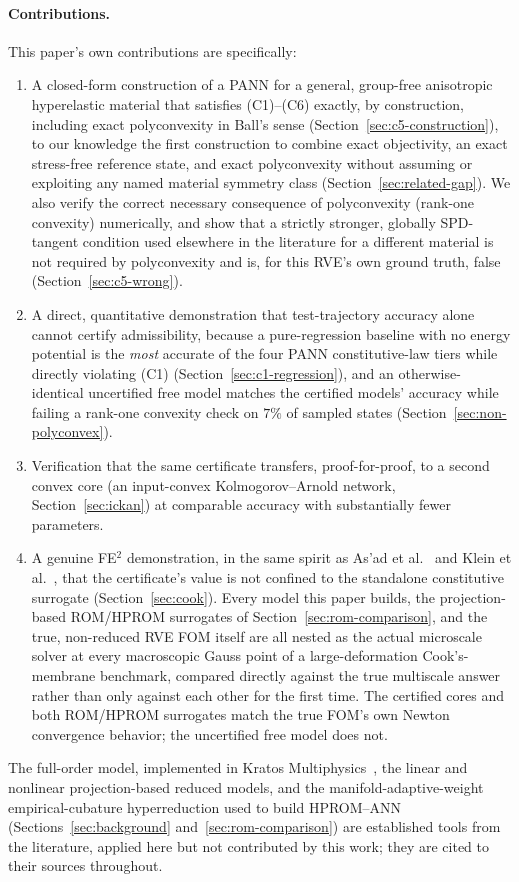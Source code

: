 \documentclass[10pt,a4paper]{article}
\begin{document}
\paragraph{Contributions.} This paper's own contributions are
specifically:
\begin{enumerate}
 \item A closed-form construction of a PANN for a general, group-free
 anisotropic hyperelastic material that satisfies (C1)--(C6) exactly, by
 construction, including exact polyconvexity in Ball's sense
 (Section~\ref{sec:c5-construction}), to our knowledge the first
 construction to combine exact objectivity, an exact stress-free reference
 state, and exact polyconvexity without assuming or exploiting any named
 material symmetry class (Section~\ref{sec:related-gap}). We also verify
 the correct necessary consequence of polyconvexity (rank-one convexity)
 numerically, and show that a strictly stronger, globally SPD-tangent
 condition used elsewhere in the literature for a different material is
 not required by polyconvexity and is, for this RVE's own ground truth,
 false (Section~\ref{sec:c5-wrong}).
 \item A direct, quantitative demonstration that test-trajectory accuracy alone
 cannot certify admissibility, because a pure-regression baseline with no energy
 potential is the \emph{most} accurate of the four PANN constitutive-law
 tiers while
 directly violating (C1) (Section~\ref{sec:c1-regression}), and an
 otherwise-identical uncertified free model matches the certified models'
 accuracy while failing a rank-one convexity check on $7\%$ of sampled
 states (Section~\ref{sec:non-polyconvex}).
 \item Verification that the same certificate transfers, proof-for-proof,
 to a second convex core (an input-convex Kolmogorov--Arnold network,
 Section~\ref{sec:ickan}) at comparable accuracy with substantially fewer
 parameters.
 \item A genuine FE$^2$ demonstration, in the same spirit as As'ad et
 al.~\cite{Asad2022} and Klein et al.~\cite{Klein2022}, that the
 certificate's value is not confined to the standalone constitutive
 surrogate (Section~\ref{sec:cook}). Every model this paper builds, the
 projection-based ROM/HPROM surrogates of
 Section~\ref{sec:rom-comparison}, and the true, non-reduced RVE FOM
 itself are all nested as the actual microscale solver at every
 macroscopic Gauss point of a large-deformation Cook's-membrane
 benchmark, compared directly against the true multiscale answer rather
 than only against each other for the first time. The certified cores
 and both ROM/HPROM surrogates match the true FOM's own Newton
 convergence behavior; the uncertified free model does not.
\end{enumerate}
The full-order model, implemented in Kratos
Multiphysics~\cite{Dadvand2010}, the linear and nonlinear
projection-based reduced models, and the manifold-adaptive-weight
empirical-cubature hyperreduction used to build HPROM--ANN
(Sections~\ref{sec:background} and~\ref{sec:rom-comparison}) are
established tools from the literature, applied here but not
contributed by this work; they are cited to their sources throughout.
\end{document}

